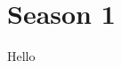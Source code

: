 \documentclass[12pt]{article}
\begin{document}
\maketitle
{}

\tableofcontents
\clearpage

\section{Season 1}
Hello

\clearpage

\printindex
\end{document}
